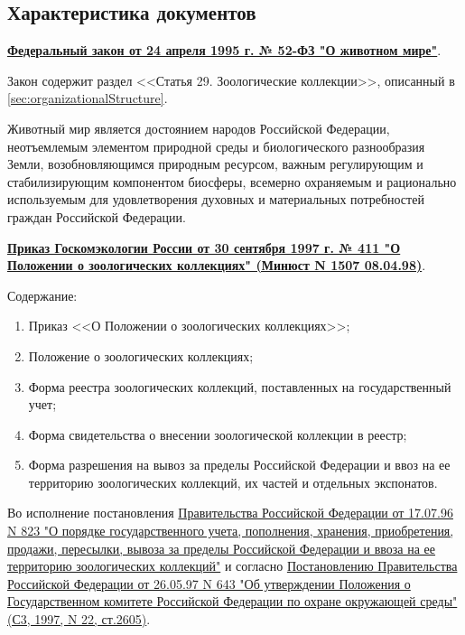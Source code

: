 \documentclass[10pt, a4paper, titlepage]{article}
\begin{document}
\subsection{Характеристика документов}

\href{https://docs.cntd.ru/document/9011346}{\textbf{Федеральный закон от 24 апреля 1995 г. № 52-ФЗ "О животном мире"}}.

Закон содержит раздел <<Статья 29. Зоологические коллекции>>, описанный в \autoref{sec:organizationalStructure}.

Животный мир является достоянием народов Российской Федерации, неотъемлемым элементом природной среды и биологического разнообразия Земли, возобновляющимся природным ресурсом, важным регулирующим и стабилизирующим компонентом биосферы, всемерно охраняемым и рационально используемым для удовлетворения духовных и материальных потребностей граждан Российской Федерации.

\href{https://docs.cntd.ru/document/58812875}{\textbf{Приказ Госкомэкологии России от 30 сентября 1997 г. № 411 "О Положении о зоологических коллекциях" (Минюст N 1507 08.04.98)}}.

Содержание:
\begin{enumerate}
    \item Приказ <<О Положении о зоологических коллекциях>>;
    
    \item Положение о зоологических коллекциях;
    
    \item Форма реестра зоологических коллекций, поставленных на государственный учет;
    
    \item Форма свидетельства о внесении зоологической коллекции в реестр;
    
    \item Форма разрешения на вывоз за пределы Российской Федерации и ввоз на ее территорию зоологических коллекций, их частей и отдельных экспонатов.

\end{enumerate}

Во исполнение постановления \href{https://docs.cntd.ru/document/9026760?marker}{Правительства Российской Федерации от 17.07.96 N 823 "О порядке государственного учета, пополнения, хранения, приобретения, продажи, пересылки, вывоза за пределы Российской Федерации и ввоза на ее территорию зоологических коллекций"} и согласно \href{https://docs.cntd.ru/document/9050595?marker}{Постановлению Правительства Российской Федерации от 26.05.97 N 643 "Об утверждении Положения о Государственном комитете Российской Федерации по охране окружающей среды" (С3, 1997, N 22, ст.2605)}.
\end{document}
